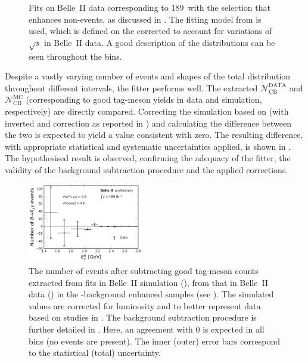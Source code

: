 \begin{figure}[htbp!]
{    }
    \caption{\label{fig:mbc_bbar_ehnhanced_fits_data}
    Fits on Belle~II data corresponding to 189~\invfb with the selection 
    that enhances non-\BtoXsgamma events, as discussed in .
    The fitting model from  is used,
    which is defined on the corrected \Mbc to account for variations of $\sqrt{s}$ in Belle~II data.
    A good description of the \Mbc distributions can be seen throughout the \EB bins.
    }
\end{figure}

Despite a vastly varying number of events and shapes of the total distribution throughout different \EB intervals,
the fitter performs well.
The extracted $\mathcal{N}_{\mathrm{CB}}^{\mathrm{DATA}}$ and $\mathcal{N}_{\mathrm{CB}}^{\mathrm{MC}}$ (corresponding to good tag-\B meson yields in data and simulation, respectively)
are directly compared.
Correcting the simulation based on  (with inverted \piVeto and \etaVeto correction as reported in ) and calculating the difference between the two is expected to yield a value consistent with zero.
The resulting difference, with appropriate statistical and systematic uncertainties applied, is shown in .
The hypothesised result is observed, confirming the adequacy of the fitter, the validity of the background subtraction procedure and the applied corrections.

\begin{figure}[htbp!]
    \centering
    \includegraphics[width=0.45\textwidth]{figures/data_validation/bbar_enhanced_event_counts.pdf}
    \caption{\label{fig:bbar_enhanced_background_subtraction}
    The number of events after subtracting good tag-\B meson counts extracted from fits in Belle~II simulation (),
    from that in Belle~II data () in the \BB-background enhanced samples (see ).
    The simulated values are corrected for luminosity and to better represent data based on studies in .
    The background subtraction procedure is further detailed in .
    Here, an agreement with 0 is expected in all \EB bins (no \BtoXsgamma events are present).
    The inner (outer) error bars correspond to the statistical (total) uncertainty.
    }
\end{figure}

